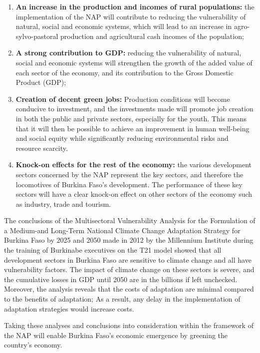 \documentclass[
]{book}
\begin{document}
\begin{enumerate}
\def\labelenumi{\arabic{enumi}.}
\item
  \textbf{An increase in the production and incomes of rural populations:} the implementation of the NAP will contribute to reducing the vulnerability of natural, social and economic systems, which will lead to an increase in agro-sylvo-pastoral production and agricultural cash incomes of the population;
\item
  \textbf{A strong contribution to GDP:} reducing the vulnerability of natural, social and economic systems will strengthen the growth of the added value of each sector of the economy, and its contribution to the Gross Domestic Product (GDP);
\item
  \textbf{Creation of decent green jobs:} Production conditions will become conducive to investment, and the investments made will promote job creation in both the public and private sectors, especially for the youth. This means that it will then be possible to achieve an improvement in human well-being and social equity while significantly reducing environmental risks and resource scarcity.
\item
  \textbf{Knock-on effects for the rest of the economy:} the various development sectors concerned by the NAP represent the key sectors, and therefore the locomotives of Burkina Faso's development. The performance of these key sectors will have a clear knock-on effect on other sectors of the economy such as industry, trade and tourism.
\end{enumerate}

The conclusions of the Multisectoral Vulnerability Analysis for the Formulation of a Medium-and Long-Term National Climate Change Adaptation Strategy for Burkina Faso by 2025 and 2050 made in 2012 by the Millennium Institute during the training of Burkinabe executives on the T21 model showed that all development sectors in Burkina Faso are sensitive to climate change and all have vulnerability factors. The impact of climate change on these sectors is severe, and the cumulative losses in GDP until 2050 are in the billions if left unchecked. Moreover, the analysis reveals that the costs of adaptation are minimal compared to the benefits of adaptation; As a result, any delay in the implementation of adaptation strategies would increase costs.

Taking these analyses and conclusions into consideration within the framework of the NAP will enable Burkina Faso's economic emergence by greening the country's economy.
\end{document}
